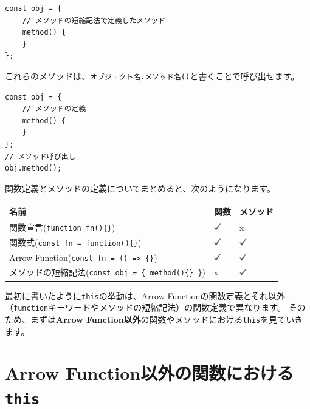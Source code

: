 \begin{lstlisting}
const obj = {
    // メソッドの短縮記法で定義したメソッド
    method() {
    }
};
\end{lstlisting}

これらのメソッドは、\texttt{オブジェクト名.メソッド名()}と書くことで呼び出せます。

\begin{lstlisting}
const obj = {
    // メソッドの定義
    method() {
    }
};
// メソッド呼び出し
obj.method();
\end{lstlisting}

関数定義とメソッドの定義についてまとめると、次のようになります。

\begin{longtable}[]{@{}lll@{}}
\toprule
名前 & 関数 & メソッド\tabularnewline
\midrule
\endhead
関数宣言(\texttt{function fn()\{\}}) & \includegraphics[clip,height=3mm]{fig/check.eps} &
x\tabularnewline
関数式(\texttt{const fn = function()\{\}}) & \includegraphics[clip,height=3mm]{fig/check.eps} &
\includegraphics[clip,height=3mm]{fig/check.eps}\tabularnewline
Arrow Function(\texttt{const fn = () => \{\}}) & \includegraphics[clip,height=3mm]{fig/check.eps} &
\includegraphics[clip,height=3mm]{fig/check.eps}\tabularnewline
メソッドの短縮記法(\texttt{const obj = \{ method()\{\} \}})
& x & \includegraphics[clip,height=3mm]{fig/check.eps}\tabularnewline
\bottomrule
\end{longtable}

最初に書いたように\texttt{this}の挙動は、Arrow
Functionの関数定義とそれ以外（\texttt{function}キーワードやメソッドの短縮記法）の関数定義で異なります。
そのため、まずは\textbf{Arrow
Function以外}の関数やメソッドにおける\texttt{this}を見ていきます。

\hypertarget{function-without-arrow-function-this}{%
\section{\texorpdfstring{Arrow
Function以外の関数における\texttt{this}}{Arrow Function以外の関数におけるthis}}\label{function-without-arrow-function-this}}

